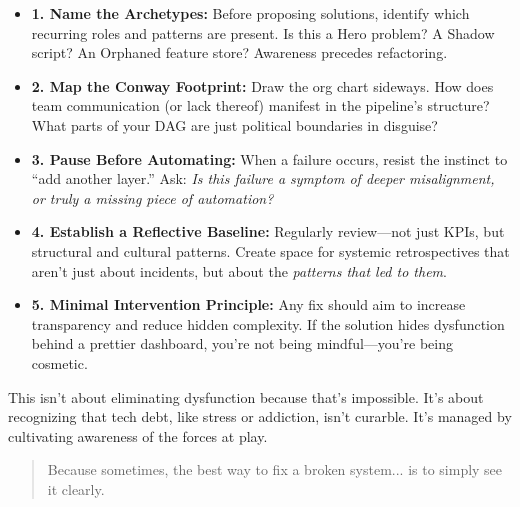 \begin{itemize}
    \item \textbf{1. Name the Archetypes:} Before proposing solutions, identify which recurring roles and patterns are present. Is this a Hero problem? A Shadow script? An Orphaned feature store? Awareness precedes refactoring.
    
    \item \textbf{2. Map the Conway Footprint:} Draw the org chart sideways. How does team communication (or lack thereof) manifest in the pipeline’s structure? What parts of your DAG are just political boundaries in disguise?
    
    \item \textbf{3. Pause Before Automating:} When a failure occurs, resist the instinct to “add another layer.” Ask: \textit{Is this failure a symptom of deeper misalignment, or truly a missing piece of automation?}
    
    \item \textbf{4. Establish a Reflective Baseline:} Regularly review—not just KPIs, but structural and cultural patterns. Create space for systemic retrospectives that aren’t just about incidents, but about the \textit{patterns that led to them}.
    
    \item \textbf{5. Minimal Intervention Principle:} Any fix should aim to increase transparency and reduce hidden complexity. If the solution hides dysfunction behind a prettier dashboard, you’re not being mindful—you’re being cosmetic.
\end{itemize}


This isn’t about eliminating dysfunction because that’s impossible. It’s about recognizing that tech debt, like stress or addiction, isn’t curarble. It’s managed by cultivating awareness of the forces at play.

\begin{quote}
Because sometimes, the best way to fix a broken system... is to simply see it clearly.
\end{quote}